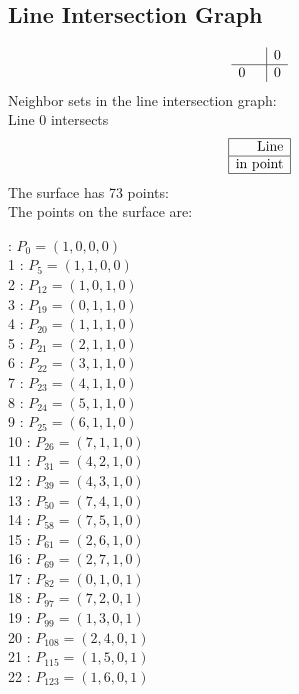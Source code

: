 \documentclass{article}
\begin{document}
{\subsection*{Line Intersection Graph}
{\arraycolsep=1pt
$$
\begin{array}{rr|*{1}r}
 &  & 0\\
\hline
0 &  & 0\\
\end{array}
$$
}%
Neighbor sets in the line intersection graph:\\
Line 0 intersects 
$$
\begin{array}{|r*{0}{|c}|}
\hline
\mbox{Line} \\
\hline
\mbox{in point} \\
\hline
\end{array}
$$
The surface has 73 points:\\
The points on the surface are:\\
\begin{multicols}{3}
 : $P_{0}=( 1, 0, 0, 0 )$\\
1 : $P_{5}=( 1, 1, 0, 0 )$\\
2 : $P_{12}=( 1, 0, 1, 0 )$\\
3 : $P_{19}=( 0, 1, 1, 0 )$\\
4 : $P_{20}=( 1, 1, 1, 0 )$\\
5 : $P_{21}=( 2, 1, 1, 0 )$\\
6 : $P_{22}=( 3, 1, 1, 0 )$\\
7 : $P_{23}=( 4, 1, 1, 0 )$\\
8 : $P_{24}=( 5, 1, 1, 0 )$\\
9 : $P_{25}=( 6, 1, 1, 0 )$\\
10 : $P_{26}=( 7, 1, 1, 0 )$\\
11 : $P_{31}=( 4, 2, 1, 0 )$\\
12 : $P_{39}=( 4, 3, 1, 0 )$\\
13 : $P_{50}=( 7, 4, 1, 0 )$\\
14 : $P_{58}=( 7, 5, 1, 0 )$\\
15 : $P_{61}=( 2, 6, 1, 0 )$\\
16 : $P_{69}=( 2, 7, 1, 0 )$\\
17 : $P_{82}=( 0, 1, 0, 1 )$\\
18 : $P_{97}=( 7, 2, 0, 1 )$\\
19 : $P_{99}=( 1, 3, 0, 1 )$\\
20 : $P_{108}=( 2, 4, 0, 1 )$\\
21 : $P_{115}=( 1, 5, 0, 1 )$\\
22 : $P_{123}=( 1, 6, 0, 1 )$\\

\end{multicols}}
\end{document}
